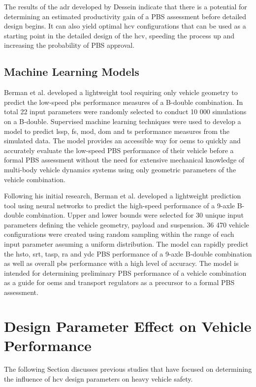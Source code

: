 The results of the \gls{adr} developed by Dessein indicate that there is a potential for determining an estimated productivity gain of a PBS assessment before detailed design begins. It can also yield optimal \gls{hcv} configurations that can be used as a starting point in the detailed design of the \gls{hcv}, speeding the process up and increasing the probability of PBS approval.

\subsection{Machine Learning Models}\label{section:machine-learning models}

Berman et al. \cite{Berman2015} developed a lightweight tool requiring only vehicle geometry to predict the low-speed \gls{pbs} performance measures of a B-double combination. In total 22 input parameters were randomly selected to conduct 10 000 simulations on a B-double. Supervised machine learning techniques were used to develop a model to predict \gls{lssp}, \gls{fs}, \gls{mod}, \gls{dom} and \gls{ts} performance measures from the simulated data. The model provides an accessible way for \glspl{oem} to quickly and accurately evaluate the low-speed PBS performance of their vehicle before a formal PBS assessment without the need for extensive mechanical knowledge of multi-body vehicle dynamics systems using only geometric parameters of the vehicle combination.

Following his initial research, Berman et al. \cite{Berman2016} developed a lightweight prediction tool using neural networks to predict the high-speed performance of a 9-axle B-double combination. Upper and lower bounds were selected for 30 unique input parameters defining the vehicle geometry, payload and suspension. 36 470 vehicle configurations were created using random sampling within the range of each input parameter assuming a uniform distribution. The model can rapidly predict the \gls{hsto}, \gls{srt}, \gls{tasp}, \gls{ra} and \gls{ydc} PBS performance of a 9-axle B-double combination as well as overall \gls{pbs} performance with a high level of accuracy. The model is intended for determining preliminary PBS performance of a vehicle combination as a guide for \glspl{oem} and transport regulators as a precursor to a formal PBS assessment.

\section{Design Parameter Effect on Vehicle Performance}\label{section:design-parameter-effect-on-vehicle-performance}
The following Section discusses previous studies that have focused on determining the influence of \gls{hcv} design parameters on heavy vehicle safety.

